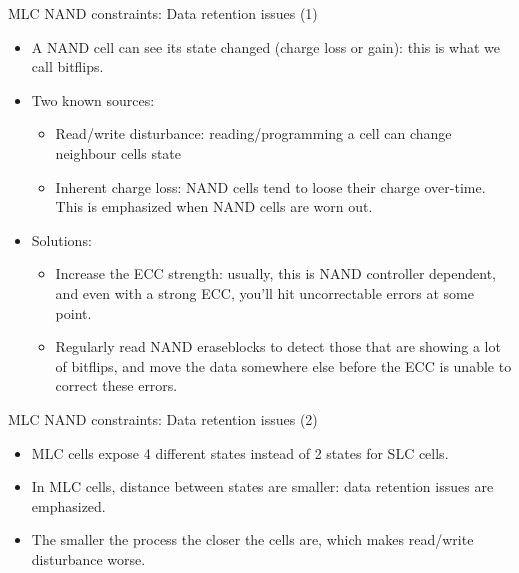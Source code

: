 \documentclass[aspectratio=169,obeyspaces,spaces,hyphens,dvipsnames]{beamer}
\begin{document}
\begin{frame}{MLC NAND constraints: Data retention issues (1)}
  \begin{itemize}
  \item A NAND cell can see its state changed (charge loss or gain):
	this is what we call bitflips.
  \item Two known sources:
    \begin{itemize}
    \item Read/write disturbance: reading/programming a cell can
	  change neighbour cells state
    \item Inherent charge loss: NAND cells tend to loose their
	  charge over-time. This is emphasized when NAND cells are
	  worn out.
    \end{itemize}
  \item Solutions:
    \begin{itemize}
    \item Increase the ECC strength: usually, this is NAND controller
	  dependent, and even with a strong ECC, you'll hit
	  uncorrectable errors at some point.
    \item Regularly read NAND eraseblocks to detect those that are
	  showing a lot of bitflips, and move the data somewhere else
	  before the ECC is unable to correct these errors.
    \end{itemize}
  \end{itemize}
\end{frame}

\begin{frame}{MLC NAND constraints: Data retention issues (2)}
  \begin{itemize}
  \item MLC cells expose 4 different states instead of 2 states for
	SLC cells.
  \item In MLC cells, distance between states are smaller: data
	retention issues are emphasized.
  \item The smaller the process the closer the cells are, which makes
	read/write disturbance worse.
  \end{itemize}
\end{frame}
\end{document}
